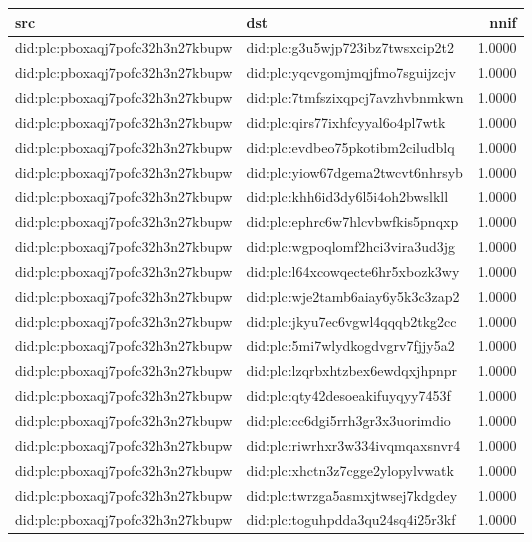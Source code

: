 \begin{tabular}{llr}
\toprule
src & dst & nnif \\
\midrule
did:plc:pboxaqj7pofc32h3n27kbupw & did:plc:g3u5wjp723ibz7twsxcip2t2 & 1.0000 \\
did:plc:pboxaqj7pofc32h3n27kbupw & did:plc:yqcvgomjmqjfmo7sguijzcjv & 1.0000 \\
did:plc:pboxaqj7pofc32h3n27kbupw & did:plc:7tmfszixqpcj7avzhvbnmkwn & 1.0000 \\
did:plc:pboxaqj7pofc32h3n27kbupw & did:plc:qirs77ixhfcyyal6o4pl7wtk & 1.0000 \\
did:plc:pboxaqj7pofc32h3n27kbupw & did:plc:evdbeo75pkotibm2ciludblq & 1.0000 \\
did:plc:pboxaqj7pofc32h3n27kbupw & did:plc:yiow67dgema2twcvt6nhrsyb & 1.0000 \\
did:plc:pboxaqj7pofc32h3n27kbupw & did:plc:khh6id3dy6l5i4oh2bwslkll & 1.0000 \\
did:plc:pboxaqj7pofc32h3n27kbupw & did:plc:ephrc6w7hlcvbwfkis5pnqxp & 1.0000 \\
did:plc:pboxaqj7pofc32h3n27kbupw & did:plc:wgpoqlomf2hci3vira3ud3jg & 1.0000 \\
did:plc:pboxaqj7pofc32h3n27kbupw & did:plc:l64xcowqecte6hr5xbozk3wy & 1.0000 \\
did:plc:pboxaqj7pofc32h3n27kbupw & did:plc:wje2tamb6aiay6y5k3c3zap2 & 1.0000 \\
did:plc:pboxaqj7pofc32h3n27kbupw & did:plc:jkyu7ec6vgwl4qqqb2tkg2cc & 1.0000 \\
did:plc:pboxaqj7pofc32h3n27kbupw & did:plc:5mi7wlydkogdvgrv7fjjy5a2 & 1.0000 \\
did:plc:pboxaqj7pofc32h3n27kbupw & did:plc:lzqrbxhtzbex6ewdqxjhpnpr & 1.0000 \\
did:plc:pboxaqj7pofc32h3n27kbupw & did:plc:qty42desoeakifuyqyy7453f & 1.0000 \\
did:plc:pboxaqj7pofc32h3n27kbupw & did:plc:cc6dgi5rrh3gr3x3uorimdio & 1.0000 \\
did:plc:pboxaqj7pofc32h3n27kbupw & did:plc:riwrhxr3w334ivqmqaxsnvr4 & 1.0000 \\
did:plc:pboxaqj7pofc32h3n27kbupw & did:plc:xhctn3z7cgge2ylopylvwatk & 1.0000 \\
did:plc:pboxaqj7pofc32h3n27kbupw & did:plc:twrzga5asmxjtwsej7kdgdey & 1.0000 \\
did:plc:pboxaqj7pofc32h3n27kbupw & did:plc:toguhpdda3qu24sq4i25r3kf & 1.0000 \\
\bottomrule
\end{tabular}
